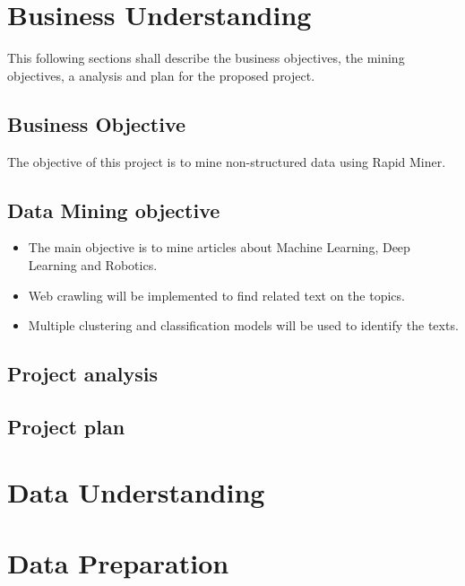 
\section*{Business Understanding}

This following sections shall describe the business objectives, the mining objectives, a analysis and plan for the proposed project.

\subsection*{Business Objective}
The objective of this project is to mine non-structured data using Rapid Miner.

\subsection*{Data Mining objective}
\begin{itemize}
	\item The main objective is to mine articles about Machine Learning, Deep Learning and Robotics. 
	\item Web crawling will be implemented to find related text on the topics.
	\item Multiple clustering and classification models will be used to identify the texts.
\end{itemize}

\subsection*{Project analysis}

 
\subsection*{Project plan}



\section*{Data Understanding}


\section*{Data Preparation}


